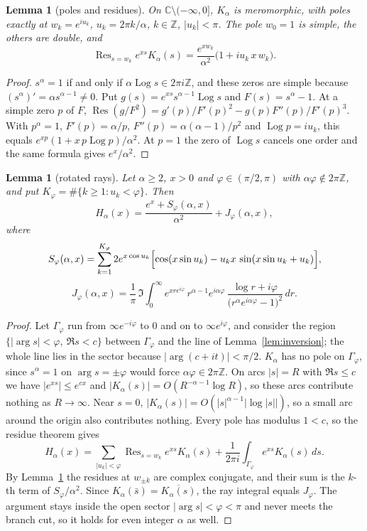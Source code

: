 \documentclass[11pt,a4paper]{article}
\theoremstyle{plain}
\newtheorem{lemma}[theorem]{Lemma}
\theoremstyle{remark}
\newcommand{\Z}{\mathbb Z}
\newcommand{\C}{\mathbb C}
\DeclareMathOperator{\Log}{Log}
\DeclareMathOperator{\Res}{Res}
\begin{document}
\begin{lemma}[poles and residues]\label{lem:poles}
On $\C\setminus(-\infty,0]$, $K_\alpha$ is meromorphic, with poles exactly at $w_k=e^{iu_k}$,
$u_k=2\pi k/\alpha$, $k\in\Z$, $|u_k|<\pi$. The pole $w_0=1$ is simple, the others are double, and
\[
 \Res_{s=w_k}e^{xs}K_\alpha(s)=\frac{e^{xw_k}}{\alpha^2}\bigl(1+iu_k\,x\,w_k\bigr).
\]
\end{lemma}
\begin{proof}
$s^\alpha=1$ if and only if $\alpha\Log s\in2\pi i\Z$, and these zeros are simple because
$(s^\alpha)'=\alpha s^{\alpha-1}\ne0$. Put $g(s)=e^{xs}s^{\alpha-1}\Log s$ and $F(s)=s^\alpha-1$.
At a simple zero $p$ of $F$, $\Res(g/F^2)=g'(p)/F'(p)^2-g(p)F''(p)/F'(p)^3$. With $p^\alpha=1$,
$F'(p)=\alpha/p$, $F''(p)=\alpha(\alpha-1)/p^2$ and $\Log p=iu_k$, this equals
$e^{xp}(1+x\,p\Log p)/\alpha^2$. At $p=1$ the zero of $\Log s$ cancels one order and the same
formula gives $e^x/\alpha^2$.
\end{proof}

\begin{lemma}[rotated rays]\label{lem:rays}
Let $\alpha\ge2$, $x>0$ and $\varphi\in(\pi/2,\pi)$ with $\alpha\varphi\notin2\pi\Z$, and put
$K_\varphi=\#\{k\ge1:u_k<\varphi\}$. Then
\begin{equation}\label{eq:rays}
 H_\alpha(x)=\frac{e^x+S_\varphi(\alpha,x)}{\alpha^2}+J_\varphi(\alpha,x),
\end{equation}
where
\[
 S_\varphi(\alpha,x)=\sum_{k=1}^{K_\varphi}2e^{x\cos u_k}
 \Bigl[\cos(x\sin u_k)-u_kx\,\sin(x\sin u_k+u_k)\Bigr],
\]
\[
 J_\varphi(\alpha,x)=\frac1\pi\,\Im\int_0^\infty e^{xre^{i\varphi}}\,r^{\alpha-1}e^{i\alpha\varphi}\,
 \frac{\log r+i\varphi}{\bigl(r^\alpha e^{i\alpha\varphi}-1\bigr)^2}\,dr .
\]
\end{lemma}
\begin{proof}
Let $\Gamma_\varphi$ run from $\infty e^{-i\varphi}$ to $0$ and on to $\infty e^{i\varphi}$, and
consider the region $\{|\arg s|<\varphi,\ \Re s<c\}$ between $\Gamma_\varphi$ and the line of
Lemma~\ref{lem:inversion}; the whole line lies in the sector because $|\arg(c+it)|<\pi/2$.
$K_\alpha$ has no pole on $\Gamma_\varphi$, since $s^\alpha=1$ on $\arg s=\pm\varphi$ would force
$\alpha\varphi\in2\pi\Z$. On arcs $|s|=R$ with $\Re s\le c$ we have $|e^{xs}|\le e^{cx}$ and
$|K_\alpha(s)|=O(R^{-\alpha-1}\log R)$, so these arcs contribute nothing as $R\to\infty$. Near
$s=0$, $|K_\alpha(s)|=O(|s|^{\alpha-1}|\log|s||)$, so a small arc around the origin also
contributes nothing. Every pole has modulus $1<c$, so the residue theorem gives
\[
 H_\alpha(x)=\sum_{|u_k|<\varphi}\Res_{s=w_k}e^{xs}K_\alpha(s)
 +\frac1{2\pi i}\int_{\Gamma_\varphi}e^{xs}K_\alpha(s)\,ds .
\]
By Lemma~\ref{lem:poles} the residues at $w_{\pm k}$ are complex conjugate, and their sum is the
$k$-th term of $S_\varphi/\alpha^2$. Since $K_\alpha(\bar s)=\overline{K_\alpha(s)}$, the ray
integral equals $J_\varphi$. The argument stays inside the open sector $|\arg s|<\varphi<\pi$ and
never meets the branch cut, so it holds for even integer $\alpha$ as well.
\end{proof}
\end{document}
